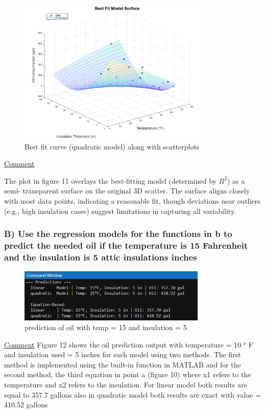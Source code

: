 \documentclass[12pt]{article}
\begin{document}
\begin{figure}[H]
    \centering
    \includegraphics[width=0.8\textwidth]{11.png}
    \caption{Best fit curve (quadratic model) along with scatterplots}
\end{figure}
\begin{adjustwidth}{0cm}{0cm}
\uline{Comment}
\end{adjustwidth}
The plot in figure 11 overlays the best-fitting model (determined by \(R^2\)) as a semi-
transparent surface on the original 3D scatter. The surface aligns closely with most data
points, indicating a reasonable fit, though deviations near outliers (e.g., high insulation
cases) suggest limitations in capturing all variability.

\subsubsection*{B) Use the regression models for the functions in b to predict the needed oil if the
temperature is 15 Fahrenheit and the insulation is 5 attic insulations inches}

\begin{figure}[H]
    \centering
    \includegraphics[width=0.8\textwidth]{12.png}
    \caption{prediction of oil with temp = 15 and insulation = 5}
\end{figure}

\uline{Comment}
Figure 12 shows the oil prediction output with temperature = 10 ° F and
insulation used = 5 inches for each model using two methods. The first method is
implemented using the built-in function in MATLAB and for the second method, the third
equation in point a (figure 10) where x1 refers to the temperature and x2 refers to the
insulation. For linear model both results are equal to 357.7 gallons also in quadratic
model both results are exact with value = 410.52 gallons
\newpage
\end{document}
